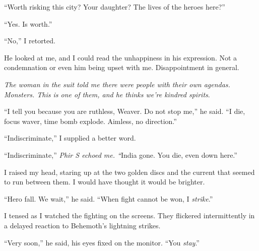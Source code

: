 ``Worth risking this city?  Your daughter?  The lives of the heroes here?''



``Yes.  Is worth.''



``No,'' I retorted.



He looked at me, and I could read the unhappiness in his expression.  Not a condemnation or even him being upset with me.  Disappointment in general.



\emph{The woman in the suit told me there were people with their own agendas.  Monsters.  This is one of them, and he thinks we're kindred spirits}.



``I tell you because you are ruthless, Weaver.  Do not stop me,'' he said.  ``I die, focus waver, time bomb explode.  Aimless, no direction.''



``Indiscriminate,'' I supplied a better word.



``Indiscriminate,'' \emph{Phir S echoed me.  ``}India gone.  You die, even down here.''



I raised my head, staring up at the two golden discs and the current that seemed to run between them.  I would have thought it would be brighter.



``Hero fall.  We wait,'' he said.  ``When fight cannot be won, I \emph{strike}.''



I tensed as I watched the fighting on the screens.  They flickered intermittently in a delayed reaction to Behemoth's lightning strikes.



``Very soon,'' he said, his eyes fixed on the monitor.  ``You \emph{stay}.''





